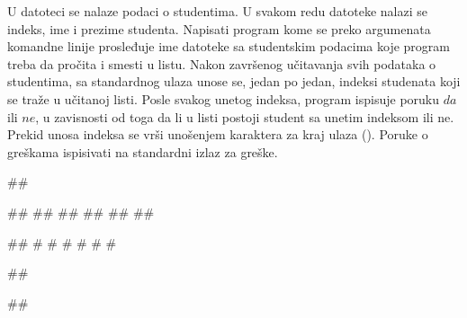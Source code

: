 \begin{Exercise}[label=4_04]
U datoteci se nalaze podaci o studentima. U svakom redu datoteke nalazi se indeks, ime i prezime studenta. 
Napisati program kome se preko argumenata komandne linije prosleđuje ime datoteke sa studentskim podacima koje program treba da pročita i smesti u listu. 
Nakon završenog učitavanja svih podataka o studentima, sa standardnog ulaza unose se, jedan po jedan, indeksi studenata koji se traže u učitanoj listi. 
Posle svakog unetog indeksa, program ispisuje poruku $da$ ili $ne$, u zavisnosti od toga da li u listi postoji student sa unetim indeksom ili ne. 
Prekid unosa indeksa se vrši unošenjem karaktera za kraj ulaza (). Poruke o greškama ispisivati na standardni izlaz za greške.



\begin{miditest}
\begin{upotreba}{1}
##

##
##
##
##
##
##

#\naslovInt#           
# #
# #
# #
\end{upotreba}
\end{miditest}
\begin{miditest}
\begin{upotreba}{2}
##

##


\end{upotreba}
\end{miditest}
\end{Exercise}
